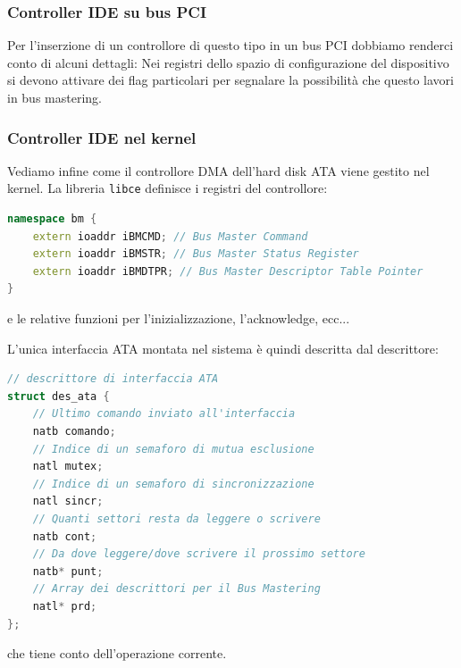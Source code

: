 \documentclass[a4paper,11pt]{article}
\begin{document}
\subsubsection{Controller IDE su bus PCI}
Per l'inserzione di un controllore di questo tipo in un bus PCI dobbiamo renderci conto di alcuni dettagli:
Nei registri dello spazio di configurazione del dispositivo si devono attivare dei flag particolari per segnalare la possibilità che questo lavori in bus mastering.

\subsubsection{Controller IDE nel kernel}
Vediamo infine come il controllore DMA dell'hard disk ATA viene gestito nel kernel.
La libreria \lstinline|libce| definisce i registri del controllore:
\begin{lstlisting}[language=C++, style=codestyle]	
namespace bm {
	extern ioaddr iBMCMD; // Bus Master Command
	extern ioaddr iBMSTR; // Bus Master Status Register
	extern ioaddr iBMDTPR; // Bus Master Descriptor Table Pointer
}
\end{lstlisting}
e le relative funzioni per l'inizializzazione, l'acknowledge, ecc...

L'unica interfaccia ATA montata nel sistema è quindi descritta dal descrittore:
\begin{lstlisting}[language=C++, style=codestyle]	
// descrittore di interfaccia ATA
struct des_ata {
	// Ultimo comando inviato all'interfaccia
	natb comando;
	// Indice di un semaforo di mutua esclusione
	natl mutex;
	// Indice di un semaforo di sincronizzazione
	natl sincr;
	// Quanti settori resta da leggere o scrivere
	natb cont;
	// Da dove leggere/dove scrivere il prossimo settore
	natb* punt;
	// Array dei descrittori per il Bus Mastering
	natl* prd;
};
\end{lstlisting}
che tiene conto dell'operazione corrente.
\end{document}

